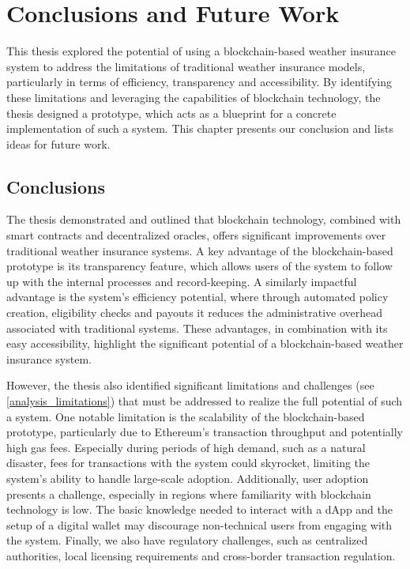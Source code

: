 \chapter{Conclusions and Future Work}\label{chapter:summary_conclusion}
This thesis explored the potential of using a blockchain-based weather insurance system to address the limitations of traditional weather insurance models, particularly in terms of efficiency, transparency and accessibility. By identifying these limitations and leveraging the capabilities of blockchain technology, the thesis designed a prototype, which acts as a blueprint for a concrete implementation of such a system. This chapter presents our conclusion and lists ideas for future work.

\section{Conclusions}\label{section:conclusions}
The thesis demonstrated and outlined that blockchain technology, combined with smart contracts and decentralized oracles, offers significant improvements over traditional weather insurance systems. A key advantage of the blockchain-based prototype is its transparency feature, which allows users of the system to follow up with the internal processes and record-keeping. A similarly impactful advantage is the system's efficiency potential, where through automated policy creation, eligibility checks and payouts it reduces the administrative overhead associated with traditional systems. These advantages, in combination with its easy accessibility, highlight the significant potential of a blockchain-based weather insurance system.

However, the thesis also identified significant limitations and challenges (see \cref{analysis_limitations}) that must be addressed to realize the full potential of such a system. One notable limitation is the scalability of the blockchain-based prototype, particularly due to Ethereum's transaction throughput and potentially high gas fees. Especially during periods of high demand, such as a natural disaster, fees for transactions with the system could skyrocket, limiting the system's ability to handle large-scale adoption. Additionally, user adoption presents a challenge, especially in regions where familiarity with blockchain technology is low. The basic knowledge needed to interact with a dApp and the setup of a digital wallet may discourage non-technical users from engaging with the system. Finally, we also have regulatory challenges, such as centralized authorities, local licensing requirements and cross-border transaction regulation.

